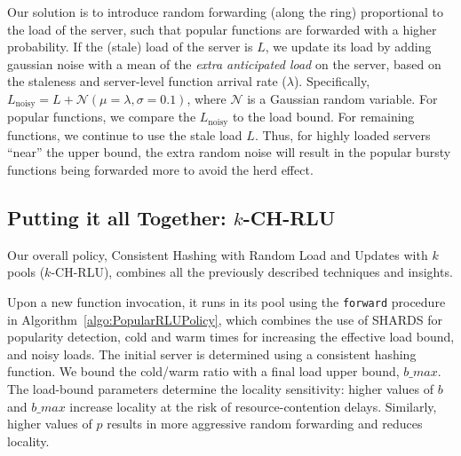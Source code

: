 Our solution is to introduce random forwarding (along the ring) proportional to the load of the server, such that popular functions are forwarded with a higher probability. 
If the (stale) load of the server is $L$, we update its load by adding gaussian noise with a mean of the \emph{extra anticipated load} on the server, based on the staleness and server-level function arrival rate ($\lambda$).
Specifically, $L_{\text{noisy}}=L+\mathcal{N}(\mu=\lambda, \sigma=0.1)$, where $\mathcal{N}$ is a Gaussian random variable. 
For popular functions, we  compare the $L_{\text{noisy}}$ to the load bound.
For remaining functions, we continue to use the stale load $L$. 
Thus, for highly loaded servers ``near'' the upper bound, the extra random noise will result in the popular bursty functions being forwarded more to avoid the herd effect.

\subsection{Putting it all Together: $k$-CH-RLU}
\label{subsec:chrlu}

Our overall policy, Consistent Hashing with Random Load and Updates with $k$ pools ($k$-CH-RLU), combines all the previously described techniques and insights.

Upon a new function invocation, it runs in its pool using the \texttt{forward} procedure in Algorithm~\ref{algo:PopularRLUPolicy}, which combines the use of SHARDS for popularity detection, cold and warm times for increasing the effective load bound, and noisy loads. 
The initial server is determined using a consistent hashing function. 
We bound the cold/warm ratio with a final load upper bound, $b\_max$.
The load-bound parameters determine the locality sensitivity: higher values of $b$ and $b\_max$ increase locality at the risk of resource-contention delays.
Similarly, higher values of $p$ results in more aggressive random forwarding and reduces locality. 

